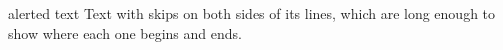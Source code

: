 \documentclass[10pt]{beamer}
\begin{document}
\begin{frame}[t]
\begin{beamercolorbox}[wd=8cm,leftskip=2em,rightskip=1em plus 2em,sep=3pt,colsep=5pt]{alerted text}
Text with skips on both sides of its lines, which are long enough to show where each one begins and ends.
\end{beamercolorbox}
\end{frame}
\end{document}
